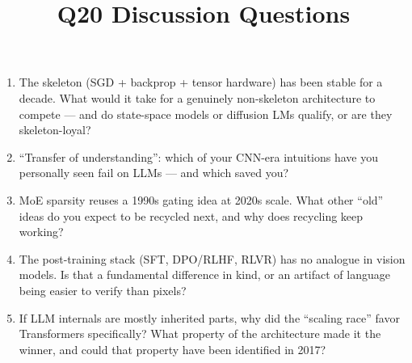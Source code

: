 \documentclass[11pt]{article}
\title{Q20 Discussion Questions}
\date{}
\begin{document}
\maketitle
\begin{enumerate}[noitemsep]
\item The skeleton (SGD + backprop + tensor hardware) has been stable for a decade. What would it take for a genuinely non-skeleton architecture to compete --- and do state-space models or diffusion LMs qualify, or are they skeleton-loyal?
\item ``Transfer of understanding'': which of your CNN-era intuitions have you personally seen fail on LLMs --- and which saved you?
\item MoE sparsity reuses a 1990s gating idea at 2020s scale. What other ``old'' ideas do you expect to be recycled next, and why does recycling keep working?
\item The post-training stack (SFT, DPO/RLHF, RLVR) has no analogue in vision models. Is that a fundamental difference in kind, or an artifact of language being easier to verify than pixels?
\item If LLM internals are mostly inherited parts, why did the ``scaling race'' favor Transformers specifically? What property of the architecture made it the winner, and could that property have been identified in 2017?
\end{enumerate}
\end{document}
